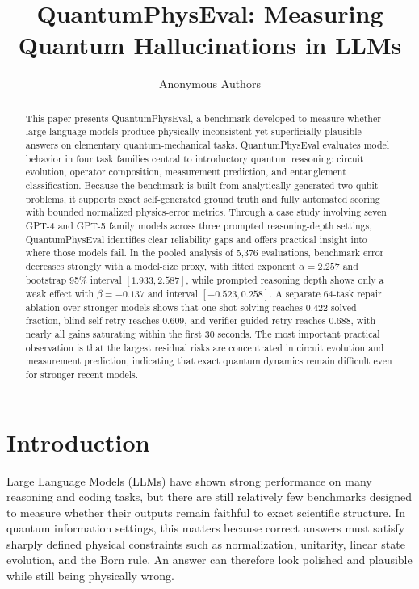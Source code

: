 \documentclass[11pt]{article}
\title{QuantumPhysEval: Measuring Quantum Hallucinations in LLMs}
\author{Anonymous Authors}
\date{}
\begin{document}
\maketitle

\begin{abstract}
This paper presents QuantumPhysEval, a benchmark developed to measure whether large language models produce physically inconsistent yet superficially plausible answers on elementary quantum-mechanical tasks. QuantumPhysEval evaluates model behavior in four task families central to introductory quantum reasoning: circuit evolution, operator composition, measurement prediction, and entanglement classification. Because the benchmark is built from analytically generated two-qubit problems, it supports exact self-generated ground truth and fully automated scoring with bounded normalized physics-error metrics. Through a case study involving seven GPT-4 and GPT-5 family models across three prompted reasoning-depth settings, QuantumPhysEval identifies clear reliability gaps and offers practical insight into where those models fail. In the pooled analysis of 5{,}376 evaluations, benchmark error decreases strongly with a model-size proxy, with fitted exponent $\alpha=2.257$ and bootstrap 95\% interval $[1.933, 2.587]$, while prompted reasoning depth shows only a weak effect with $\beta=-0.137$ and interval $[-0.523, 0.258]$. A separate 64-task repair ablation over stronger models shows that one-shot solving reaches 0.422 solved fraction, blind self-retry reaches 0.609, and verifier-guided retry reaches 0.688, with nearly all gains saturating within the first 30 seconds. The most important practical observation is that the largest residual risks are concentrated in circuit evolution and measurement prediction, indicating that exact quantum dynamics remain difficult even for stronger recent models.
\end{abstract}

\section{Introduction}
Large Language Models (LLMs) have shown strong performance on many reasoning and coding tasks, but there are still relatively few benchmarks designed to measure whether their outputs remain faithful to exact scientific structure. In quantum information settings, this matters because correct answers must satisfy sharply defined physical constraints such as normalization, unitarity, linear state evolution, and the Born rule. An answer can therefore look polished and plausible while still being physically wrong.
\end{document}
